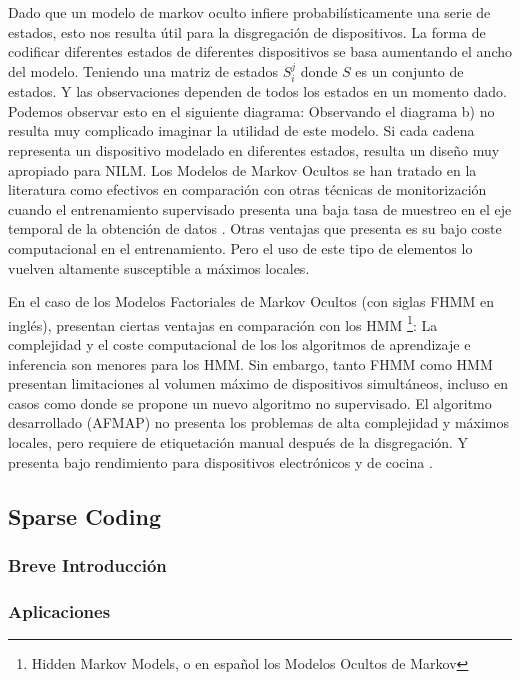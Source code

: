 Dado que un modelo de markov oculto infiere probabilísticamente una serie de estados, esto nos resulta útil para la disgregación de dispositivos. La forma de codificar diferentes estados de diferentes dispositivos se basa aumentando el ancho del modelo. Teniendo una matriz de estados $S_i^j$ donde $S$ es un conjunto de estados. Y las observaciones dependen de todos los estados en un momento dado. Podemos observar esto en el siguiente diagrama:
Observando el diagrama b) no resulta muy complicado imaginar la utilidad de este modelo. Si cada cadena representa un dispositivo modelado en diferentes estados, resulta un diseño muy apropiado para NILM.
Los Modelos de Markov Ocultos se han tratado en la literatura como efectivos en comparación con otras técnicas de monitorización cuando el entrenamiento supervisado presenta una baja tasa de muestreo en el eje temporal de la obtención de datos \autocite{frenchHMMNILM}.
Otras ventajas que presenta es su bajo coste computacional en el entrenamiento. Pero el uso de este tipo de elementos lo vuelven altamente susceptible a máximos locales\autocite{NILMreview2017}.

En el caso de los Modelos Factoriales de Markov Ocultos (con siglas FHMM en inglés), presentan ciertas ventajas en comparación con los HMM \footnote{Hidden Markov Models, o en español los Modelos Ocultos de Markov}:
La complejidad y el coste computacional de los los algoritmos de aprendizaje e inferencia son menores para los HMM. Sin embargo, tanto FHMM como HMM presentan limitaciones al volumen máximo de dispositivos simultáneos, incluso en casos como \autocite{afmap2012} donde se propone un nuevo algoritmo no supervisado. El algoritmo desarrollado (AFMAP) no presenta los problemas de alta complejidad y máximos locales, pero requiere de etiquetación manual después de la disgregación. Y presenta bajo rendimiento para dispositivos electrónicos y de cocina \autocite[5]{NILMreview2017}.

\subsection{Sparse Coding}
\subsubsection{Breve Introducción}
\autocite{stanfordSparse}

\subsubsection{Aplicaciones}


